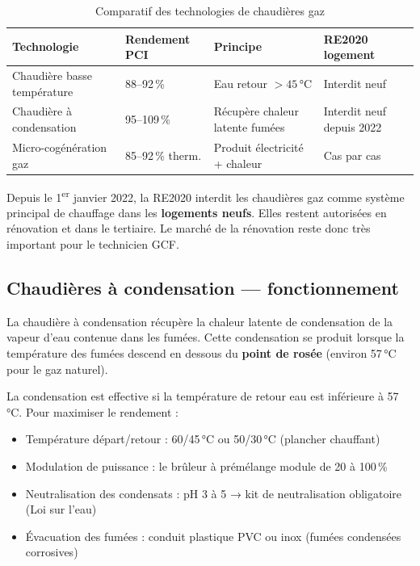 \begin{table}[H]
  \centering
  \caption{Comparatif des technologies de chaudières gaz}
  \begin{tabular}{p{3.5cm}p{3cm}p{3cm}p{2.5cm}}
    \toprule
    Technologie & Rendement PCI & Principe & RE2020 logement \\
    \midrule
    Chaudière basse température & 88–92\,\% & Eau retour $> 45$\,°C & Interdit neuf \\
    Chaudière à condensation & 95–109\,\% & Récupère chaleur latente fumées & Interdit neuf depuis 2022 \\
    Micro-cogénération gaz & 85–92\,\% therm. & Produit électricité + chaleur & Cas par cas \\
    \bottomrule
  \end{tabular}
\end{table}

\begin{attention}
Depuis le 1\textsuperscript{er} janvier 2022, la RE2020 interdit les chaudières gaz comme système principal de chauffage dans les \textbf{logements neufs}. Elles restent autorisées en rénovation et dans le tertiaire. Le marché de la rénovation reste donc très important pour le technicien GCF.
\end{attention}

\subsection{Chaudières à condensation — fonctionnement}

La chaudière à condensation récupère la chaleur latente de condensation de la vapeur d'eau contenue dans les fumées. Cette condensation se produit lorsque la température des fumées descend en dessous du \textbf{point de rosée} (environ 57\,°C pour le gaz naturel).

\begin{methode}[title=Conditions de fonctionnement en condensation]
La condensation est effective si la température de retour eau est inférieure à 57\,°C. Pour maximiser le rendement :
\begin{itemize}
  \item Température départ/retour : 60/45\,°C ou 50/30\,°C (plancher chauffant)
  \item Modulation de puissance : le brûleur à prémélange module de 20 à 100\,\%
  \item Neutralisation des condensats : pH 3 à 5 → kit de neutralisation obligatoire (Loi sur l'eau)
  \item Évacuation des fumées : conduit plastique PVC ou inox (fumées condensées corrosives)
\end{itemize}
\end{methode}

